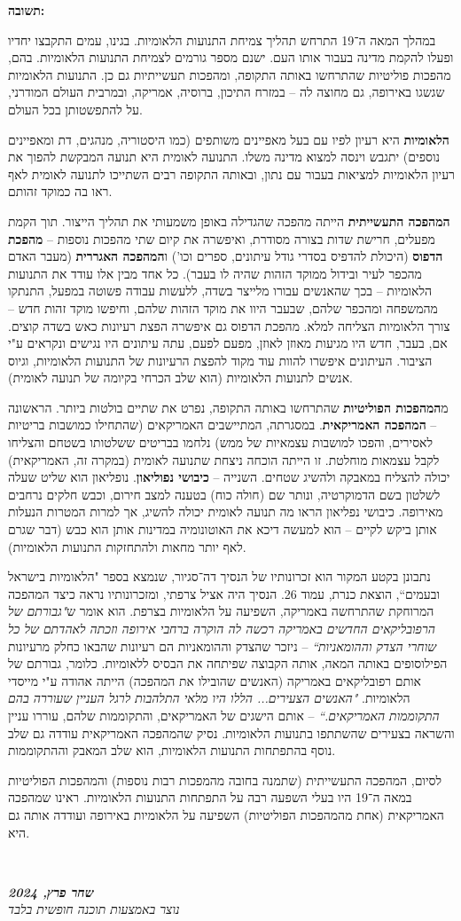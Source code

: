 \documentclass[]{article}
\newcommand\ndoc  {\dotfill \\ \vfil {\begin{center} {\textbf{\textit{שחר פרץ, 2024}} \\ \scriptsize \textit{נוצר באמצעות תוכנה חופשית בלבד}} \end{center}} \vfil	}
\newcommand\bs    {\blacksquare}
\begin{document}
		\textbf{תשובה: }
		
		במהלך המאה ה־19 התרחש תהליך צמיחת התנועות הלאומיות. בגינו, עמים התקבצו יחדיו ופעלו להקמת מדינה בעבור אותו העם. ישנם מספר גורמים לצמיחת התנועות הלאומיות. בהם, מהפכות פוליטיות שהתרחשו באותה התקופה, ומהפכות תעשייתיות גם כן. התנועות הלאומיות שגשגו באירופה, גם מחוצה לה – במזרח התיכון, ברוסיה, אמריקה, ובמרבית העולם המודרני, על להתפשטותן בכל העולם. 
		
		\textbf{הלאומיות} היא רעיון לפיו עם בעל מאפיינים משותפים (כמו היסטוריה, מנהגים, דת ומאפיינים נוספים) יתגבש וינסה למצוא מדינה משלו. התנועה לאומית היא תנועה המבקשת להפוך את רעיון הלאומיות למציאות בעבור עם נתון, ובאותה התקופה רבים השתייכו לתנועה לאומית לאף ראו בה כמוקד זהותם. 
		
		\textbf{המהפכה התעשייתית} הייתה מהפכה שהגדילה באופן משמעותי את תהליך הייצור. תוך הקמת מפעלים, חרישת שדות בצורה מסודרת, ואיפשרה את קיום שתי מהפכות נוספות – \textbf{מהפכת הדפוס} (היכולת להדפיס בסדרי גודל עיתונים, ספרים וכו') ו\textbf{המהפכה האגררית} (מעבר האדם מהכפר לעיר ובידול ממוקד הזהות שהיה לו בעבר). כל אחד מבין אלו עודד את התנועות הלאומיות – בכך שהאנשים עבורו מלייצר בשדה, ללעשות עבודה פשוטה במפעל, התנתקו מהמשפחה ומהכפר שלהם, שבעבר היוו את מוקד הזהות שלהם, וחיפשו מוקד זהות חדש – צורך הלאומיות הצליחה למלא. מהפכת הדפוס גם איפשרה הפצת רעיונות כאש בשדה קוצים. אם, בעבר, חדש היו מגיעות מאוזן לאוזן, מפעם לפעם, עתה עיתונים היו נגישים ונקראים ע"י הציבור. העיתונים איפשרו להוות עוד מקוד להפצת הרעיונות של התנועות הלאומיות, וגיוס אנשים לתנועות הלאומיות (הוא שלב הכרחי בקיומה של תנועה לאומית). 
		
		מ\textbf{המהפכות הפוליטיות} שהתרחשו באותה התקופה, נפרט את שתיים בולטות ביותר. הראשונה – \textbf{המהפכה האמריקאית}. במסגרתה, המתיישבים האמריקאים (שהתחילו כמושבות בריטיות לאסירים, והפכו למושבות עצמאיות של ממש) נלחמו בבריטים ששלטותו בשטחם והצליחו לקבל עצמאות מוחלטת. זו הייתה הוכחה ניצחת שתנועה לאומית (במקרה זה, האמריקאית) יכולה להצליח במאבקה ולהשיג שטחים. השנייה – \textbf{כיבושי נפוליאון}. נופליאון הוא שליט שעלה לשלטון בשם הדמוקרטיה, ונותר שם (חולה כוח) בטענה למצב חירום, וכבש חלקים נרחבים מאירופה. כיבושי נפליאון הראו מה תנועה לאומית יכולה להשיג, אך למרות המטרות הנעלות אותן ביקש לקיים – הוא למעשה דיכא את האוטונומיה במדינות אותן הוא כבש (דבר שגרם לאף יותר מחאות ולהתחזקות התנועות הלאומיות). 
		
		נתבונן בקטע המקור הוא זכרונותיו של הנסיך דה־סגיור, שנמצא בספר "הלאומיות בישראל ובעמים``, הוצאת כנרת, עמוד 26. הנסיך היה אציל צרפתי, ומזכרונותיו נראה כיצד המהפכה המרוחקת שהתרחשה באמריקה, השפיעה על הלאומיות בצרפת. הוא אומר ש\textit{"גבורתם של הרפובליקאים החדשים באמריקה רכשה לה הוקרה ברחבי אירופה וזכתה לאהדתם של כל שוחרי הצדק וההומאניות``} – ניזכר שהצדק וההומאניות הם רעיונות שהבאו כחלק מרעיונות הפילוסופים באותה המאה, אותה הקבוצה שפיתחה את הבסיס ללאומיות. כלומר, גבורתם של אותם רפובליקאים באמריקה (האנשים שהובילו את המהפכה) הייתה אהודה ע"י מייסדי הלאומיות. \textit{"האנשים הצעירים... הללו היו מלאי התלהבות לרגל העניין שעוררה בהם התקוממות האמריקאים.``} – אותם הישגים של האמריקאים, והתקוממות שלהם, עוררו עניין והשראה בצעירים שהשתתפו בתנועות הלאומיות. נסיק שהמהפכה האמריקאית עודדה גם שלב נוסף בהתפתחות התנועות הלאומיות, הוא שלב המאבק וההתקוממות. 
		
		לסיום, המהפכה התעשייתית (שתמנה בחובה מהמפכות רבות נוספות) והמהפכות הפוליטיות במאה ה־19 היו בעלי השפעה רבה על התפתחות התנועות הלאומיות. ראינו שמהפכה האמריקאית (אחת מהמהפכות הפוליטיות) השפיעה על הלאומיות באירופה ועודדה אותה גם היא. \hfill \bs 
		
		\ndoc
		
		
		
		
\end{document}
